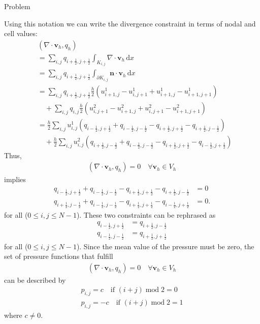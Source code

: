 \begin {blocktheorem}{Problem}
\begin{solution}
Using this notation we can write the divergence constraint in terms of nodal and cell values:
\begin{align*}
 &(\nabla \cdot \boldsymbol{v}_h, q_h)\\
   &= \sum_{i,j} q_{i+\frac12,j+\frac12} \int_{K_{i,j}} \nabla \cdot \boldsymbol{v}_h \,\mathrm{d}x\\
   &= \sum_{i,j} q_{i+\frac12,j+\frac12} \int_{\partial K_{i,j}} \boldsymbol{n} \cdot \boldsymbol{v}_h \,\mathrm{d}x\\
   &= \sum_{i,j} q_{i+\frac12,j+\frac12} \frac{h}{2}(u^1_{i+1,j}-u^1_{i,j+1}+u^1_{i+1,j}-u^1_{i+1,j+1})\\
      &\quad +\sum_{i,j} q_{i,j} \frac{h}{2}(u^2_{i,j+1}-u^2_{i+1,j}+u^2_{i,j+1}-u^2_{i+1,j+1})\\
   &= \frac{h}{2}\sum_{i,j} u^1_{i,j}(q_{i-\frac12,j+\frac12}+q_{i-\frac12,j-\frac12}-q_{i+\frac12,j+\frac12}-q_{i+\frac12,j-\frac12})\\
      &\quad +\frac{h}{2}\sum_{i,j} u^2_{i,j}(q_{i+\frac12,j-\frac12}+q_{i-\frac12,j-\frac12}-q_{i+\frac12,j+\frac12}-q_{i-\frac12,j+\frac12})
\end{align*}
Thus,
\begin{align*}
(\nabla \cdot \boldsymbol{v}_h, q_h)=0 \quad \forall \boldsymbol{v}_h\in V_h
\end{align*}
implies
\begin{align*}
q_{i-\frac12,j+\frac12}+q_{i-\frac12,j-\frac12}-q_{i+\frac12,j+\frac12}-q_{i+\frac12,j-\frac12} &=0 \\
q_{i+\frac12,j-\frac12}+q_{i-\frac12,j-\frac12}-q_{i+\frac12,j+\frac12}-q_{i-\frac12,j+\frac12} &=0.
\end{align*}
for all ($0\leq i,j \leq N-1$).
These two constraints can be rephrased as
\begin{align*}
q_{i-\frac12,j+\frac12} &= q_{i+\frac12,j-\frac12} \\
q_{i-\frac12,j-\frac12} &= q_{i+\frac12,j+\frac12}
\end{align*}
for all ($0\leq i,j \leq N-1$). Since the mean value of the pressure must be zero,
the set of pressure functions that fulfill
\begin{align*}
(\nabla \cdot \boldsymbol{v}_h, q_h)=0 \quad \forall \boldsymbol{v}_h\in V_h
\end{align*}
can be described by
\begin{align*}
 p_{i,j} = c \quad \text{if } (i+j) \operatorname{mod} 2 = 0\\
 p_{i,j} = -c \quad \text{if } (i+j) \operatorname{mod} 2 = 1
\end{align*}
where $c\not=0$.
\end{solution}
\end{blocktheorem}




